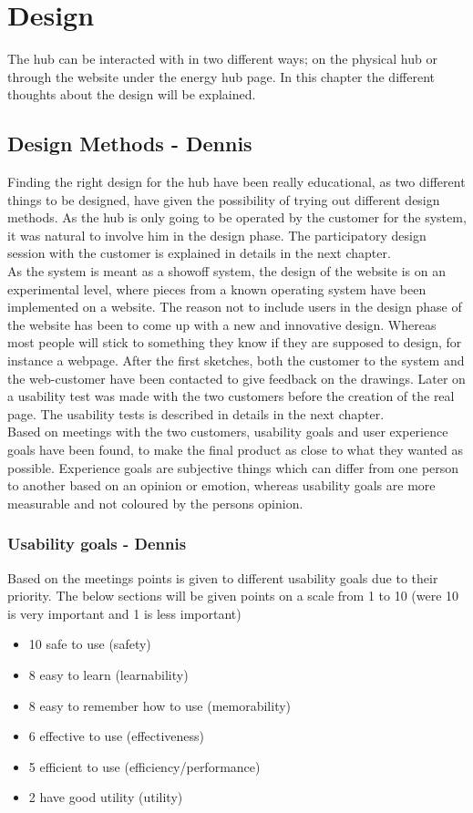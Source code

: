 \chapter{Design}
The hub can be interacted with in two different ways; on the physical hub or through the website under the energy hub page. In this chapter the different thoughts about the design will be explained.
\section{Design Methods - Dennis}
Finding the right design for the hub have been really educational, as two different things to be designed, have given the possibility of trying out different design methods. As the hub is only going to be operated by the customer for the system, it was natural to involve him in the design phase. The participatory design session with the customer is explained in details in the next chapter.
\\As the system is meant as a showoff system, the design of the website is on an experimental level, where pieces from a known operating system have been implemented on a website. The reason not to include users in the design phase of the website has been to come up with a new and innovative design. Whereas most people will stick to something they know if they are supposed to design, for instance a webpage. After the first sketches, both the customer to the system and the web-customer have been contacted to give feedback on the drawings. Later on a usability test was made with the two customers before the creation of the real page. The usability tests is described in details in the next chapter.
\\[0.2cm]
Based on meetings with the two customers, usability goals and user experience goals have been found, to make the final product as close to what they wanted as possible. Experience goals are subjective things which can differ from one person to another based on an opinion or emotion, whereas usability goals are more measurable and not coloured by the persons opinion.
\subsection{Usability goals - Dennis}
Based on the meetings points is given to different usability goals due to their priority. 
The below sections will be given points on a scale from 1 to 10 (were 10 is very important and 1 is less important)
\begin{itemize}
	\item 10 safe to use (safety)
	\item 8 easy to learn (learnability) 
	\item 8 easy to remember how to use (memorability)
	\item 6 effective to use (effectiveness) 
	\item 5 efficient to use (efficiency/performance)
	\item 2 have good utility (utility)	
\end{itemize}
